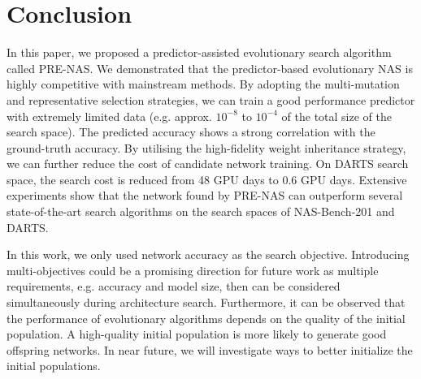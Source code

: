 \documentclass[sigconf]{acmart}
\begin{document}
\section{Conclusion}
In this paper, we proposed a predictor-assisted evolutionary search algorithm called PRE-NAS. We demonstrated that the predictor-based evolutionary NAS is highly competitive with mainstream methods. By adopting the multi-mutation and representative selection strategies, we can train a good performance predictor with extremely limited data (e.g. approx. $10^{-8}$ to $10^{-4}$ of the total size of the search space).  The predicted accuracy shows a strong correlation with the ground-truth accuracy. By utilising the high-fidelity weight inheritance strategy, we can further reduce the cost of candidate network training.  On DARTS search space, the search cost is reduced from 48 GPU days to 0.6 GPU days. Extensive experiments show that the network found by PRE-NAS can outperform several state-of-the-art search algorithms on the search spaces of NAS-Bench-201 and DARTS. 

In this work, we only used network accuracy as the search objective.  Introducing multi-objectives could be a promising direction for future work as multiple requirements, e.g. accuracy and model size, then can be considered simultaneously during architecture search.  Furthermore, it can be observed that the performance of evolutionary algorithms depends on the quality of the initial population.  A high-quality initial population is more likely to generate good offspring networks.  In near future, we will investigate ways to better initialize the initial populations. 



\end{document}
